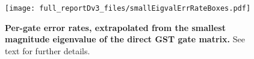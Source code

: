{\begin{figure}
\begin{center}
\texttt{[image: full\_reportDv3\_files/smallEigvalErrRateBoxes.pdf]}
\caption{\textbf{Per-gate error rates, extrapolated from the smallest magnitude eigenvalue of the direct GST gate matrix.}  See text for further details.\label{smallEigvalErrRateColorBoxPlot}}
\end{center}
\end{figure}


}{}


